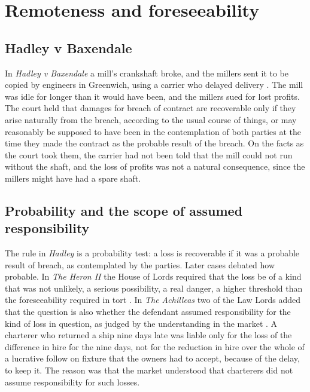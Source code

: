 \section{Remoteness and foreseeability}

\subsection{Hadley v Baxendale}

In \emph{Hadley v Baxendale} a mill's crankshaft broke, and the millers sent it to be copied by engineers in Greenwich, using a carrier who delayed delivery \citep{hadley1854}. The mill was idle for longer than it would have been, and the millers sued for lost profits. The court held that damages for breach of contract are recoverable only if they arise naturally from the breach, according to the usual course of things, or may reasonably be supposed to have been in the contemplation of both parties at the time they made the contract as the probable result of the breach. On the facts as the court took them, the carrier had not been told that the mill could not run without the shaft, and the loss of profits was not a natural consequence, since the millers might have had a spare shaft.

\subsection{Probability and the scope of assumed responsibility}

The rule in \emph{Hadley} is a probability test: a loss is recoverable if it was a probable result of breach, as contemplated by the parties. Later cases debated how probable. In \emph{The Heron II} the House of Lords required that the loss be of a kind that was not unlikely, a serious possibility, a real danger, a higher threshold than the foreseeability required in tort \citep{heron1969}. In \emph{The Achilleas} two of the Law Lords added that the question is also whether the defendant assumed responsibility for the kind of loss in question, as judged by the understanding in the market \citep{achilleas2008}. A charterer who returned a ship nine days late was liable only for the loss of the difference in hire for the nine days, not for the reduction in hire over the whole of a lucrative follow on fixture that the owners had to accept, because of the delay, to keep it. The reason was that the market understood that charterers did not assume responsibility for such losses.

